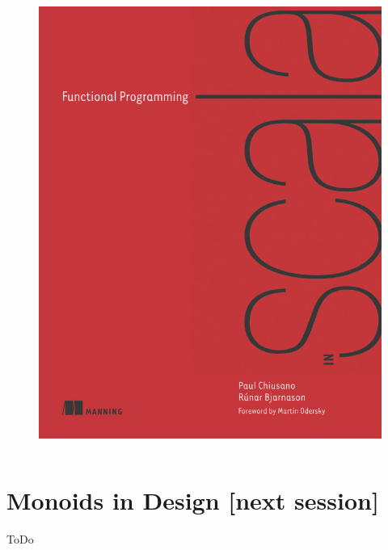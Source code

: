 \documentclass{beamer}
\begin{document}
\begin{frame}
\begin{columns}[c]
    \begin{figure}
        \centering
        \includegraphics[width=\textwidth]{functional-programming-in-scala.png}
    \end{figure}
  \end{columns}
\end{frame}

\section{Monoids in Design \color[rgb]{0.5,0.1,0.9}[next session]}

\begin{frame}{ToDo}
\end{frame}
\end{document}
